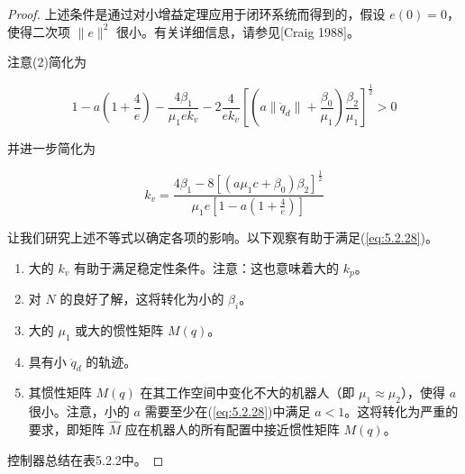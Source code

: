 \documentclass[UTF8,12pt,a4paper]{ctexart}
\begin{document}
\begin{proof}
上述条件是通过对小增益定理应用于闭环系统而得到的，假设 $e(0) = 0$，使得二次项 $\|e\|^2$ 很小。有关详细信息，请参见[Craig 1988]。

注意(2)简化为

\begin{equation}
1 - a\left(1 + \frac{4}{e}\right) - \frac{4\beta_1}{\mu_1 e k_v} - 2\frac{4}{e k_v}\left[\left(a\|\ddot{q}_d\| + \frac{\beta_0}{\mu_1}\right)\frac{\beta_2}{\mu_1}\right]^{\frac{1}{2}} > 0
\end{equation}

并进一步简化为

\begin{equation}\label{eq:5.2.28}
k_v = \frac{4\beta_1 - 8[(a\mu_1 c + \beta_0)\beta_2]^{\frac{1}{2}}}{\mu_1 e[1 - a(1 + \frac{4}{e})]}
\end{equation}

让我们研究上述不等式以确定各项的影响。以下观察有助于满足(\ref{eq:5.2.28})。
\begin{enumerate}
    \item 大的 $k_v$ 有助于满足稳定性条件。注意：这也意味着大的 $k_p$。
    \item 对 $N$ 的良好了解，这将转化为小的 $\beta_i$。
    \item 大的 $\mu_1$ 或大的惯性矩阵 $M(q)$。
    \item 具有小 $\ddot{q}_d$ 的轨迹。
    \item 其惯性矩阵 $M(q)$ 在其工作空间中变化不大的机器人（即 $\mu_1 \approx \mu_2$），使得 $a$ 很小。注意，小的 $a$ 需要至少在(\ref{eq:5.2.28})中满足 $a < 1$。这将转化为严重的要求，即矩阵 $\hat{M}$ 应在机器人的所有配置中接近惯性矩阵 $M(q)$。
\end{enumerate}

控制器总结在表5.2.2中。


\end{proof}
\end{document}
